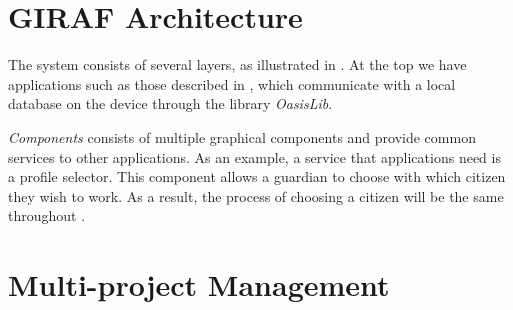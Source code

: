 \section{GIRAF Architecture}
\label{sec:giraf:architecture}
The \giraf system consists of several layers, as illustrated in .
At the top we have applications such as those described in , which communicate with a local database on the device through the library \textit{OasisLib}.

\textit{\giraf Components} consists of multiple graphical components and provide common services to other \giraf applications.
As an example, a service that applications need is a profile selector.
This component allows a guardian to choose with which citizen they wish to work.
As a result, the process of choosing a citizen will be the same throughout \giraf.


\section{Multi-project Management}\label{sec:collab:multiproject}
